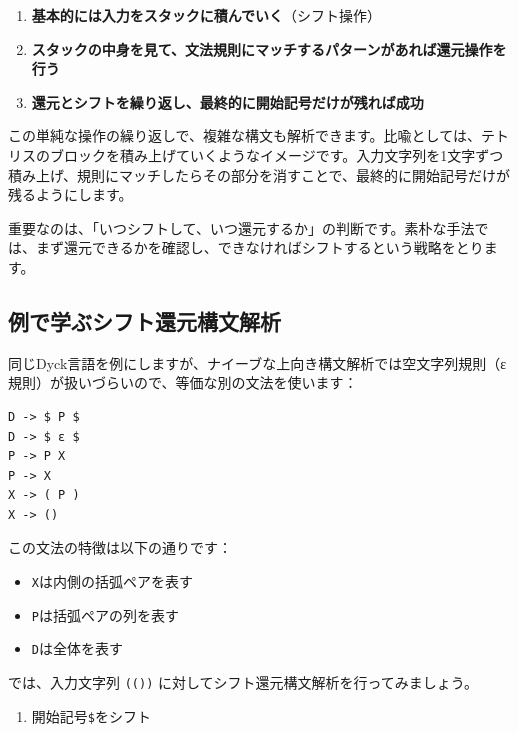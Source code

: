 \begin{enumerate}
\def\labelenumi{\arabic{enumi}.}
\tightlist
\item
  \textbf{基本的には入力をスタックに積んでいく}（シフト操作）
\item
  \textbf{スタックの中身を見て、文法規則にマッチするパターンがあれば還元操作を行う}
\item
  \textbf{還元とシフトを繰り返し、最終的に開始記号だけが残れば成功}
\end{enumerate}

この単純な操作の繰り返しで、複雑な構文も解析できます。比喩としては、テトリスのブロックを積み上げていくようなイメージです。入力文字列を1文字ずつ積み上げ、規則にマッチしたらその部分を消すことで、最終的に開始記号だけが残るようにします。

重要なのは、「いつシフトして、いつ還元するか」の判断です。素朴な手法では、まず還元できるかを確認し、できなければシフトするという戦略をとります。

\hypertarget{chapter5-ux4f8bux3067ux5b66ux3076ux30b7ux30d5ux30c8ux9084ux5143ux69cbux6587ux89e3ux6790}{%
\subsection{例で学ぶシフト還元構文解析}\label{chapter5-ux4f8bux3067ux5b66ux3076ux30b7ux30d5ux30c8ux9084ux5143ux69cbux6587ux89e3ux6790}}

同じDyck言語を例にしますが、ナイーブな上向き構文解析では空文字列規則（ε規則）が扱いづらいので、等価な別の文法を使います：

\begin{verbatim}
D -> $ P $
D -> $ ε $
P -> P X
P -> X
X -> ( P )
X -> ()
\end{verbatim}

この文法の特徴は以下の通りです：

\begin{itemize}
\tightlist
\item
  \texttt{X}は内側の括弧ペアを表す
\item
  \texttt{P}は括弧ペアの列を表す
\item
  \texttt{D}は全体を表す
\end{itemize}

では、入力文字列 \texttt{(())}
に対してシフト還元構文解析を行ってみましょう。

\begin{enumerate}
\def\labelenumi{\arabic{enumi}.}
\tightlist
\item
  開始記号\texttt{\$}をシフト
\end{enumerate}

